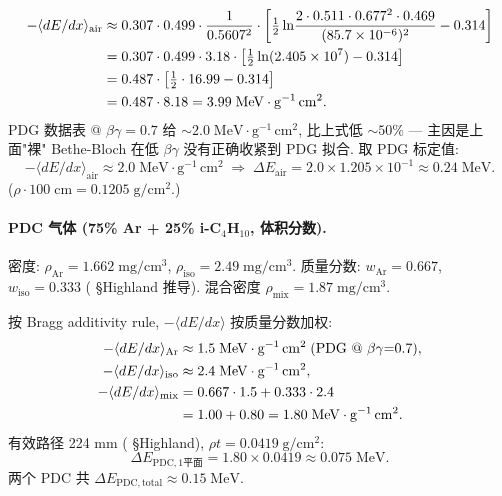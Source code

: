 \begin{align}
  -\langle dE/dx \rangle_\mathrm{air}
  &\approx 0.307 \cdot 0.499 \cdot \frac{1}{0.5607^2} \cdot
  \left[\tfrac{1}{2}\ln\!\frac{2 \cdot 0.511 \cdot 0.677^2 \cdot 0.469}{(85.7\times 10^{-6})^2} - 0.314\right] \notag\\
  &= 0.307 \cdot 0.499 \cdot 3.18 \cdot
  \left[\tfrac{1}{2}\ln(2.405\times 10^7) - 0.314\right] \notag\\
  &= 0.487 \cdot \left[\tfrac{1}{2} \cdot 16.99 - 0.314\right] \notag\\
  &= 0.487 \cdot 8.18 = 3.99\;\mathrm{MeV \cdot g^{-1}\,cm^2}.
\end{align}
PDG 数据表 @ $\beta\gamma = 0.7$ 给 $\sim 2.0\;\mathrm{MeV \cdot g^{-1}\,cm^2}$, 比上式低 $\sim 50\%$ — 主因是上面"裸" Bethe-Bloch 在低 $\beta\gamma$ 没有正确收紧到 PDG 拟合. 取 PDG 标定值:
\begin{equation}
  -\langle dE/dx \rangle_\mathrm{air} \approx 2.0\;\mathrm{MeV \cdot g^{-1}\,cm^2}
  \;\Rightarrow\;
  \Delta E_\mathrm{air} = 2.0 \times 1.205 \times 10^{-1} \approx 0.24\;\mathrm{MeV}.
  \label{eq:partIc:dE_air}
\end{equation}
($\rho \cdot 100\;\mathrm{cm} = 0.1205\;\mathrm{g/cm^2}$.)

\paragraph{PDC 气体 (75\% Ar + 25\% i-C$_4$H$_{10}$, 体积分数).}
密度: $\rho_\mathrm{Ar} = 1.662\;\mathrm{mg/cm^3}$, $\rho_\mathrm{iso} = 2.49\;\mathrm{mg/cm^3}$.
质量分数: $w_\mathrm{Ar} = 0.667$, $w_\mathrm{iso} = 0.333$ (\StatusReport{} §Highland 推导).
混合密度 $\rho_\mathrm{mix} = 1.87\;\mathrm{mg/cm^3}$.

按 Bragg additivity rule, $-\langle dE/dx \rangle$ 按质量分数加权:
\begin{align}
  -\langle dE/dx\rangle_\mathrm{Ar} &\approx 1.5\;\mathrm{MeV \cdot g^{-1}\,cm^2} \;\text{(PDG @ $\beta\gamma{=}0.7$)}, \\
  -\langle dE/dx\rangle_\mathrm{iso} &\approx 2.4\;\mathrm{MeV \cdot g^{-1}\,cm^2}, \\
  -\langle dE/dx\rangle_\mathrm{mix} &= 0.667 \cdot 1.5 + 0.333 \cdot 2.4 \notag\\
  &= 1.00 + 0.80 = 1.80\;\mathrm{MeV \cdot g^{-1}\,cm^2}.
\end{align}
有效路径 224 mm (\StatusReport{} §Highland), $\rho t = 0.0419\;\mathrm{g/cm^2}$:
\begin{equation}
  \Delta E_\mathrm{PDC,1平面} = 1.80 \times 0.0419 \approx 0.075\;\mathrm{MeV}.
  \label{eq:partIc:dE_PDC}
\end{equation}
两个 PDC 共 $\Delta E_\mathrm{PDC,total} \approx 0.15\;\mathrm{MeV}$.

